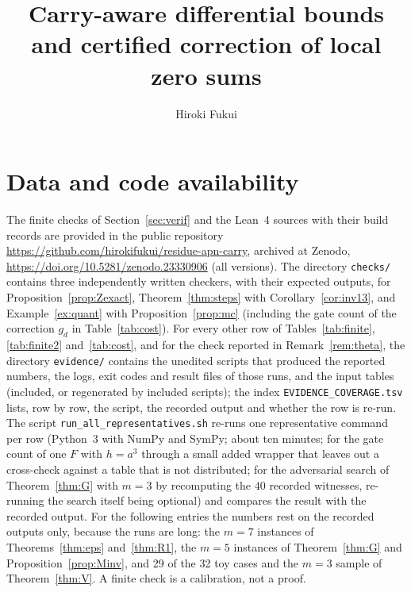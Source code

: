 \documentclass[11pt]{amsart}
\title[Carry-aware differential bounds and local zero sums]{Carry-aware differential bounds and certified correction of local zero sums}
\author{Hiroki Fukui}
\theoremstyle{definition}
\begin{document}
\begin{abstract}

\end{abstract}

\maketitle
\tableofcontents










\section*{Data and code availability}
The finite checks of Section~\ref{sec:verif} and the Lean~4 sources with their build records are provided in the public
repository \url{https://github.com/hirokifukui/residue-apn-carry}, archived at Zenodo,
\url{https://doi.org/10.5281/zenodo.23330906} (all versions).
The directory \texttt{checks/} contains three independently written checkers, with their expected outputs, for
Proposition~\ref{prop:Zexact}, Theorem~\ref{thm:steps} with Corollary~\ref{cor:inv13}, and Example~\ref{ex:quant} with
Proposition~\ref{prop:mc} (including the gate count of the correction $g_d$ in Table~\ref{tab:cost}). For every other row of
Tables~\ref{tab:finite}, \ref{tab:finite2} and~\ref{tab:cost}, and for the check reported in Remark~\ref{rem:theta}, the
directory \texttt{evidence/} contains the unedited scripts that produced the reported numbers, the logs, exit codes and result
files of those runs, and the input tables (included, or regenerated by included scripts); the index
\texttt{EVIDENCE\_COVERAGE.tsv} lists, row by row, the script, the recorded output and whether the row is re-run. The script
\texttt{run\_all\_representatives.sh} re-runs one representative command per row (Python~3 with NumPy and SymPy; about ten
minutes; for the gate count of one $F$ with $h=a^3$ through a small added wrapper that leaves out a cross-check against a
table that is not distributed; for the adversarial search of Theorem~\ref{thm:G} with $m=3$ by recomputing the $40$ recorded
witnesses, re-running the search itself being optional) and compares the result with the recorded output. For the following entries the numbers rest on the recorded outputs
only, because the runs are long: the $m=7$ instances of Theorems~\ref{thm:eps} and~\ref{thm:R1}, the $m=5$ instances of
Theorem~\ref{thm:G} and Proposition~\ref{prop:Minv}, and 29 of the 32 toy cases and the $m=3$ sample of Theorem~\ref{thm:V}.
A finite check is a calibration, not a proof.
\end{document}

